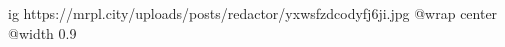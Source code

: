  
 
 
 
 

\ifcmt
  ig https://mrpl.city/uploads/posts/redactor/yxwsfzdcodyfj6ji.jpg
  @wrap center
  @width 0.9
\fi
